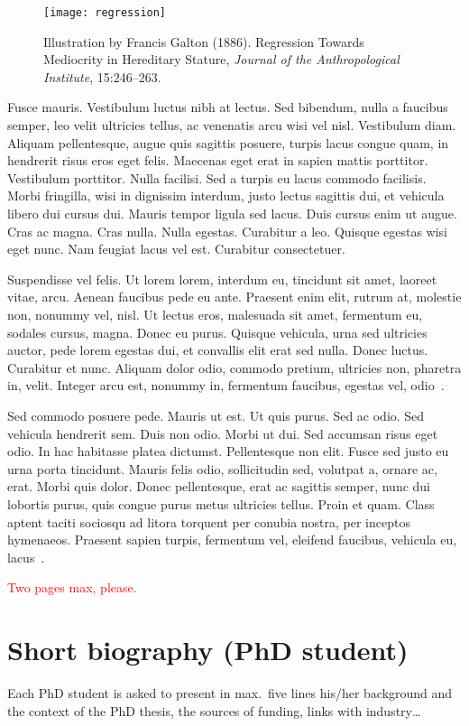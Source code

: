 \documentclass[a4paper,10pt,oneside]{article}
\begin{document}
\begin{figure}
  \centering
  \texttt{[image: regression]}
  \caption{\small%
    Illustration by Francis Galton (1886). Regression Towards Mediocrity in Hereditary
    Stature, \emph{Journal of the Anthropological Institute}, 15:246--263.}
\end{figure}

Fusce mauris. Vestibulum luctus nibh at lectus. Sed bibendum, nulla a
faucibus semper, leo velit ultricies tellus, ac venenatis arcu wisi
vel nisl. Vestibulum diam. Aliquam pellentesque, augue quis sagittis
posuere, turpis lacus congue quam, in hendrerit risus eros eget felis.
Maecenas eget erat in sapien mattis porttitor. Vestibulum porttitor.
Nulla facilisi. Sed a turpis eu lacus commodo facilisis. Morbi
fringilla, wisi in dignissim interdum, justo lectus sagittis dui, et
vehicula libero dui cursus dui. Mauris tempor ligula sed lacus. Duis
cursus enim ut augue. Cras ac magna. Cras nulla. Nulla egestas.
Curabitur a leo. Quisque egestas wisi eget nunc. Nam feugiat lacus vel
est.  Curabitur consectetuer.

Suspendisse vel felis. Ut lorem lorem, interdum eu, tincidunt sit
amet, laoreet vitae, arcu. Aenean faucibus pede eu ante. Praesent enim
elit, rutrum at, molestie non, nonummy vel, nisl. Ut lectus eros,
malesuada sit amet, fermentum eu, sodales cursus, magna. Donec eu
purus. Quisque vehicula, urna sed ultricies auctor, pede lorem egestas
dui, et convallis elit erat sed nulla. Donec luctus. Curabitur et
nunc.  Aliquam dolor odio, commodo pretium, ultricies non, pharetra
in, velit. Integer arcu est, nonummy in, fermentum faucibus, egestas
vel, odio~\cite{degroot1962, cowie2022}.

Sed commodo posuere pede. Mauris ut est. Ut quis purus. Sed ac odio.
Sed vehicula hendrerit sem. Duis non odio. Morbi ut dui. Sed accumsan
risus eget odio. In hac habitasse platea dictumst. Pellentesque non
elit. Fusce sed justo eu urna porta tincidunt. Mauris felis odio,
sollicitudin sed, volutpat a, ornare ac, erat. Morbi quis dolor. Donec
pellentesque, erat ac sagittis semper, nunc dui lobortis purus, quis
congue purus metus ultricies tellus. Proin et quam. Class aptent
taciti sociosqu ad litora torquent per conubia nostra, per inceptos
hymenaeos. Praesent sapien turpis, fermentum vel, eleifend faucibus,
vehicula eu, lacus~\cite{diaconis1988}.

\textcolor{red}{Two pages max, please.}

\section*{Short biography (PhD student)}

Each PhD student is asked to present in max.\ five lines his/her
background and the context of the PhD thesis, the sources of funding,
links with industry\ldots



\end{document}
